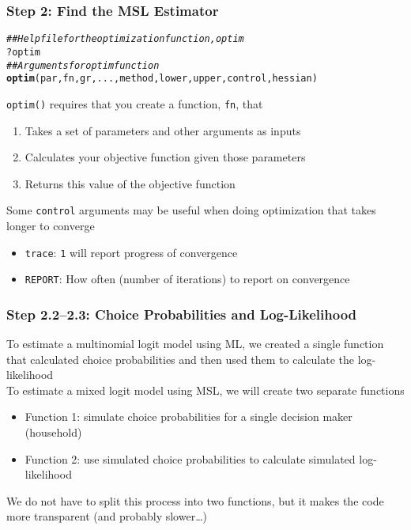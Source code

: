 \documentclass{beamer}\usepackage[]{graphicx}\usepackage[]{color}
\makeatletter
\newcommand{\hlcom}[1]{\textcolor[rgb]{0.678,0.584,0.686}{\textit{#1}}}%
\newcommand{\hlopt}[1]{\textcolor[rgb]{0,0,0}{#1}}%
\newcommand{\hlstd}[1]{\textcolor[rgb]{0.345,0.345,0.345}{#1}}%
\newcommand{\hlkwd}[1]{\textcolor[rgb]{0.737,0.353,0.396}{\textbf{#1}}}%
\newenvironment{kframe}{%
 \def\at@end@of@kframe{}%
 \ifinner\ifhmode%
  \def\at@end@of@kframe{\end{minipage}}%
  \begin{minipage}{\columnwidth}%
 \fi\fi%
 \def\FrameCommand##1{\hskip\@totalleftmargin \hskip-\fboxsep
 \colorbox{shadecolor}{##1}\hskip-\fboxsep
     \hskip-\linewidth \hskip-\@totalleftmargin \hskip\columnwidth}%
 \MakeFramed {\advance\hsize-\width
   \@totalleftmargin\z@ \linewidth\hsize
   \@setminipage}}%
 {\par\unskip\endMakeFramed%
 \at@end@of@kframe}
\newenvironment{knitrout}{}{} %
\makeatother
\begin{document}
\begin{frame}[fragile]\frametitle{Step 2: Find the MSL Estimator}
\begin{knitrout}\footnotesize
{}\color{fgcolor}\begin{kframe}
\begin{alltt}
\hlcom{## Help file for the optimization function, optim}
\hlopt{?}\hlstd{optim}
\hlcom{## Arguments for optim function}
\hlkwd{optim}\hlstd{(par, fn, gr, ..., method, lower, upper, control, hessian)}
\end{alltt}
\end{kframe}
\end{knitrout}
    \vspace{2ex}
	\texttt{optim()} requires that you create a function, \texttt{fn}, that
	\begin{enumerate}
		\item Takes a set of parameters and other arguments as inputs
		\item Calculates your objective function given those parameters
		\item Returns this value of the objective function
	\end{enumerate}
	\vspace{2ex}
	Some \texttt{control} arguments may be useful when doing optimization that takes longer to converge
	\begin{itemize}
		\item \texttt{trace}: \texttt{1} will report progress of convergence
		\item \texttt{REPORT}: How often (number of iterations) to report on convergence
	\end{itemize}
\end{frame}

\begin{frame}\frametitle{Step 2.2--2.3: Choice Probabilities and Log-Likelihood}
    To estimate a multinomial logit model using ML, we created a single function that calculated choice probabilities and then used them to calculate the log-likelihood \\
    \vspace{2ex}
    To estimate a mixed logit model using MSL, we will create two separate functions
    \begin{itemize}
    	\item Function 1: simulate choice probabilities for a single decision maker (household)
    	\item Function 2: use simulated choice probabilities to calculate simulated log-likelihood
    \end{itemize}
    \vspace{2ex}
    We do not have to split this process into two functions, but it makes the code more transparent (and probably slower\ldots)
\end{frame}
\end{document}
